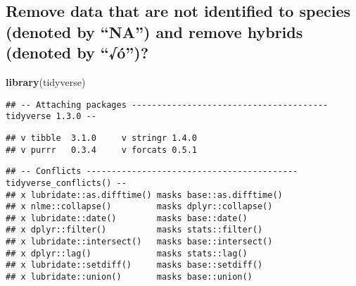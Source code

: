 \documentclass[
]{article}
\newenvironment{Shaded}{\begin{snugshade}}{\end{snugshade}}
\newcommand{\KeywordTok}[1]{\textcolor[rgb]{0.13,0.29,0.53}{\textbf{#1}}}
\newcommand{\NormalTok}[1]{#1}
\newcommand{\OperatorTok}[1]{\textcolor[rgb]{0.81,0.36,0.00}{\textbf{#1}}}
\newcommand{\StringTok}[1]{\textcolor[rgb]{0.31,0.60,0.02}{#1}}
\begin{document}
\hypertarget{remove-data-that-are-not-identified-to-species-denoted-by-na-and-remove-hybrids-denoted-by-uxf3}{%
\subsection{Remove data that are not identified to species (denoted by
``NA'') and remove hybrids (denoted by
``√ó'')?}\label{remove-data-that-are-not-identified-to-species-denoted-by-na-and-remove-hybrids-denoted-by-uxf3}}

\begin{Shaded}
\begin{Highlighting}[]
\KeywordTok{library}\NormalTok{(tidyverse)}
\end{Highlighting}
\end{Shaded}

\begin{verbatim}
## -- Attaching packages --------------------------------------- tidyverse 1.3.0 --
\end{verbatim}

\begin{verbatim}
## v tibble  3.1.0     v stringr 1.4.0
## v purrr   0.3.4     v forcats 0.5.1
\end{verbatim}

\begin{verbatim}
## -- Conflicts ------------------------------------------ tidyverse_conflicts() --
## x lubridate::as.difftime() masks base::as.difftime()
## x nlme::collapse()         masks dplyr::collapse()
## x lubridate::date()        masks base::date()
## x dplyr::filter()          masks stats::filter()
## x lubridate::intersect()   masks base::intersect()
## x dplyr::lag()             masks stats::lag()
## x lubridate::setdiff()     masks base::setdiff()
## x lubridate::union()       masks base::union()
\end{verbatim}

\begin{Shaded}
\end{Shaded}
\end{document}
